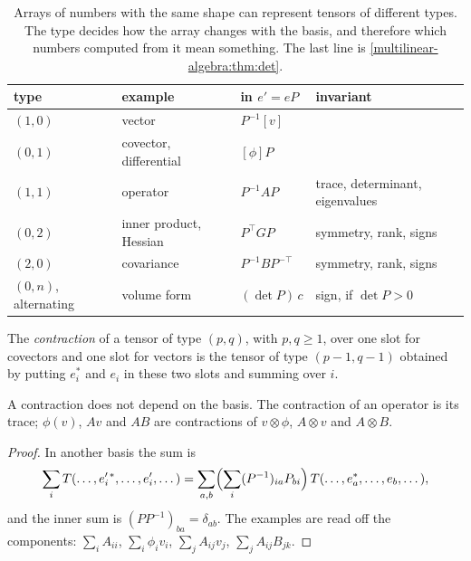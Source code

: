 \begin{notechapter}
\begin{table}[ht]
\centering
\begin{tabular}{@{}llll@{}}
\toprule
type & example & in $e' = eP$ & invariant \\
\midrule
$(1, 0)$ & vector & $P^{-1}[v]$ & \\
$(0, 1)$ & covector, differential & $[\phi]P$ & \\
$(1, 1)$ & operator & $P^{-1}AP$ & trace, determinant, eigenvalues \\
$(0, 2)$ & inner product, Hessian & $P^\top GP$
  & symmetry, rank, signs \\
$(2, 0)$ & covariance & $P^{-1}BP^{-\top}$ & symmetry, rank, signs \\
$(0, n)$, alternating & volume form & $(\det P)\,c$
  & sign, if $\det P > 0$ \\
\bottomrule
\end{tabular}
\caption{Arrays of numbers with the same shape can represent tensors of
different types. The type decides how the array changes with the basis,
and therefore which numbers computed from it mean something. The last
line is \cref{multilinear-algebra:thm:det}.}
\label{multilinear-algebra:tab:types}
\end{table}

\begin{definition}[Contraction]\label{multilinear-algebra:def:contraction}
The \emph{contraction} of a tensor of type $(p, q)$, with $p, q\geq1$,
over one slot for covectors and one slot for vectors is the tensor of
type $(p - 1, q - 1)$ obtained by putting $e_i^*$ and $e_i$ in these two
slots and summing over $i$.
\end{definition}

\begin{proposition}\label{multilinear-algebra:prop:contraction}
A contraction does not depend on the basis. The contraction of an
operator is its trace; $\phi(v)$, $Av$ and $AB$ are contractions of
$v\otimes\phi$, $A\otimes v$ and $A\otimes B$.
\end{proposition}

\begin{proof}
In another basis the sum is
\[
  \sum_iT(\dots,e'^{\,*}_i,\dots,e'_i,\dots)
  = \sum_{a, b}\Bigl(\sum_i(P^{-1})_{ia}P_{bi}\Bigr)\,
    T(\dots,e_a^*,\dots,e_b,\dots) ,
\]
and the inner sum is $(PP^{-1})_{ba} = \delta_{ab}$. The examples are
read off the components: $\sum_iA_{ii}$, $\sum_i\phi_iv_i$,
$\sum_jA_{ij}v_j$, $\sum_jA_{ij}B_{jk}$.
\end{proof}


\end{notechapter}
